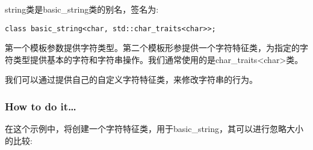 
string类是basic\_string类的别名，签名为:

\begin{lstlisting}[style=styleCXX]
class basic_string<char, std::char_traits<char>>;
\end{lstlisting}

第一个模板参数提供字符类型。第二个模板形参提供一个字符特征类，为指定的字符类型提供基本的字符和字符串操作。我们通常使用的是char\_traits<char>类。

我们可以通过提供自己的自定义字符特征类，来修改字符串的行为。

\subsubsection{How to do it…}

在这个示例中，将创建一个字符特征类，用于basic\_string，其可以进行忽略大小的比较:

